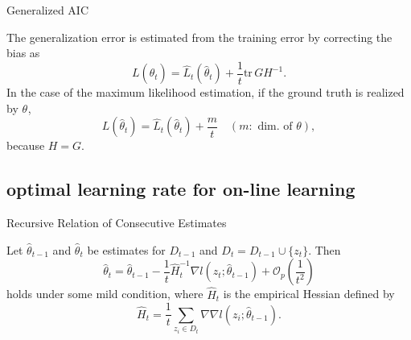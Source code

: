 \documentclass[fleqn,aspectratio=1610]{beamer}
\begin{document}
\begin{frame}[label={sec:org1a22a00}]{Generalized AIC}
\begin{corollary}[Akaike, 1974]\label{sec:orgf325a83}
The generalization error is
estimated from the training error by correcting the bias as
\begin{equation}
  L(\hat\theta_{t})
  =
  \hat{L}_{t}(\hat\theta_{t})
  +\frac{1}{t}\mathrm{tr}\, GH^{-1}.
\end{equation}
In the case of the maximum likelihood estimation,
if the ground truth is realized by \(\theta_{}\), 
\begin{equation}
  L(\hat\theta_{t})
  =
  \hat{L}_{t}(\hat\theta_{t})
  +\frac{m}{t}\quad (m:\text{ dim.\ of }\theta),
\end{equation}
because \(H=G\).
\end{corollary}
\end{frame}

\subsection{optimal learning rate for on-line learning}
\label{sec:orgc3ee714}
\begin{frame}[label={sec:org1a9eff8}]{Recursive Relation of Consecutive Estimates}
\begin{lemma}\label{sec:org037048c}
Let \(\hat\theta_{t-1}\) and \(\hat\theta_{t}\) be estimates for
\(D_{t-1}\) and \(D_{t}=D_{t-1}\cup\{z_{t}\}\).
Then
\begin{equation}
  \hat\theta_{t}
  =\hat\theta_{t-1}
  -\frac{1}{t}\hat{H}_{t}^{-1}\nabla l(z_{t};\hat\theta_{t-1})
  +\mathcal{O}_p\left(\frac{1}{t^2}\right)
\end{equation}
holds under some mild condition,
where \(\hat{H}_{t}\) is the empirical Hessian defined by
\begin{equation}
  \hat{H}_{t}=\frac{1}{t}\sum_{z_{i}\in D_{t}}
  \nabla\nabla l(z_{i};\hat\theta_{t-1}).
\end{equation}
\end{lemma}
\end{frame}
\end{document}
